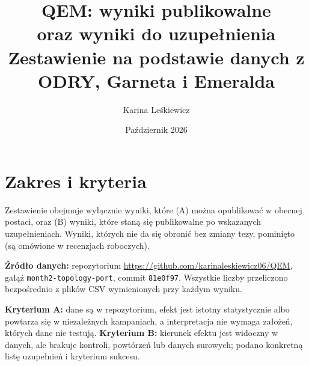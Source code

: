 \documentclass[11pt,a4paper]{article}
\title{QEM: wyniki publikowalne\\ oraz wyniki do uzupełnienia\\[4pt]
\large Zestawienie na podstawie danych z ODRY, Garneta i Emeralda}
\author{Karina Leśkiewicz}
\date{Październik 2026}
\begin{document}
\maketitle

\section*{Zakres i kryteria}

Zestawienie obejmuje wyłącznie wyniki, które (A) można opublikować w obecnej postaci, oraz
(B) wyniki, które staną się publikowalne po wskazanych uzupełnieniach. Wyniki, których nie
da się obronić bez zmiany tezy, pominięto (są omówione w recenzjach roboczych).

\textbf{Źródło danych:} repozytorium \url{https://github.com/karinaleskiewicz06/QEM},
gałąź \texttt{month2-topology-port}, commit \texttt{81e0f97}. Wszystkie liczby przeliczono
bezpośrednio z plików CSV wymienionych przy każdym wyniku.

\textbf{Kryterium A:} dane są w repozytorium, efekt jest istotny statystycznie albo
powtarza się w niezależnych kampaniach, a interpretacja nie wymaga założeń, których dane
nie testują. \textbf{Kryterium B:} kierunek efektu jest widoczny w danych, ale brakuje
kontroli, powtórzeń lub danych surowych; podano konkretną listę uzupełnień i kryterium
sukcesu.
\end{document}
